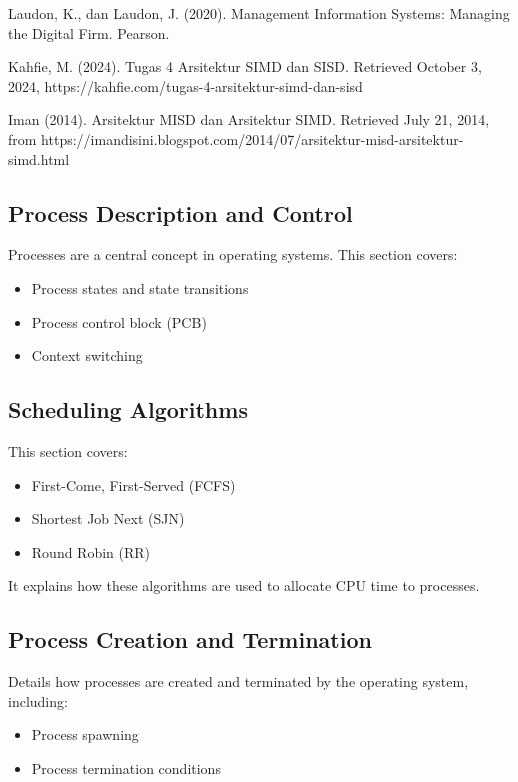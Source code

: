 \documentclass[12pt]{article}
\begin{document}
\begin{thebibliography}{9} 

 Laudon, K., dan Laudon, J. (2020). Management Information Systems: Managing the Digital Firm. Pearson.

 Kahfie, M. (2024). Tugas 4 Arsitektur SIMD dan SISD. Retrieved October 3, 2024, https://kahfie.com/tugas-4-arsitektur-simd-dan-sisd

 Iman (2014). Arsitektur MISD dan Arsitektur SIMD. Retrieved July 21, 2014, from https://imandisini.blogspot.com/2014/07/arsitektur-misd-arsitektur-simd.html



\end{thebibliography}

\subsection{Process Description and Control}
Processes are a central concept in operating systems. This section covers:
\begin{itemize}
    \item Process states and state transitions
    \item Process control block (PCB)
    \item Context switching
\end{itemize}

\subsection{Scheduling Algorithms}
This section covers:
\begin{itemize}
    \item First-Come, First-Served (FCFS)
    \item Shortest Job Next (SJN)
    \item Round Robin (RR)
\end{itemize}
It explains how these algorithms are used to allocate CPU time to processes.

\subsection{Process Creation and Termination}
Details how processes are created and terminated by the operating system, including:
\begin{itemize}
    \item Process spawning
    \item Process termination conditions
\end{itemize}
\end{document}
